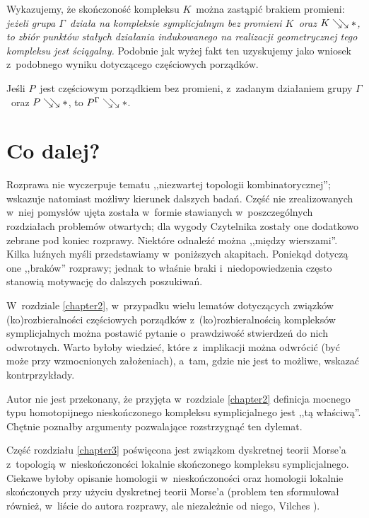 Wykazujemy, że skończoność kompleksu $K$~można zastąpić brakiem promieni: \textit{jeżeli grupa $\Gamma$~działa na kompleksie symplicjalnym bez promieni $K$~oraz $K\searrow\!\!\searrow *$, to zbiór punktów stałych działania indukowanego na realizacji geometrycznej tego kompleksu jest ściągalny.} Podobnie jak wyżej fakt ten uzyskujemy jako wniosek z~podobnego wyniku dotyczącego częściowych porządków.

\begin{stw*}[\ref{stw-sciaglana_g_przestrzen_sciagalne_punkty_stale}]
Jeśli $P$~jest częściowym porządkiem bez promieni, z~zadanym działaniem grupy $\Gamma$~oraz $P\searrow\!\!\searrow *$, to $P^\Gamma\searrow\!\!\searrow *$.  
\end{stw*}

\section*{Co dalej?}
Rozprawa nie wyczerpuje tematu ,,niezwartej topologii kombinatorycznej''; wskazuje natomiast możliwy kierunek dalszych badań. Część nie zrealizowanych w~niej pomysłów ujęta została w~formie stawianych w~poszczególnych rozdziałach problemów otwartych; dla wygody Czytelnika zostały one dodatkowo zebrane pod koniec rozprawy. Niektóre odnaleźć można ,,między wierszami''. Kilka luźnych myśli przedstawiamy w~poniższych akapitach. Poniekąd dotyczą one ,,braków'' rozprawy; jednak to właśnie braki i~niedopowiedzenia często stanowią motywację do dalszych poszukiwań.

W~rozdziale \ref{chapter2}, w~przypadku wielu lematów dotyczących związków (ko)rozbieralności częściowych porządków z~(ko)rozbieralnością kompleksów symplicjalnych można postawić pytanie o~prawdziwość stwierdzeń do nich odwrotnych. Warto byłoby wiedzieć, które z~implikacji można odwrócić (być może przy wzmocnionych założeniach), a~tam, gdzie nie jest to możliwe, wskazać kontrprzykłady.

Autor nie jest przekonany, że przyjęta w~rozdziale \ref{chapter2} definicja mocnego typu homotopijnego nieskończonego kompleksu symplicjalnego jest ,,tą właściwą''. Chętnie poznałby argumenty pozwalające rozstrzygnąć ten dylemat.

Część rozdziału \ref{chapter3} poświęcona jest związkom dyskretnej teorii Morse'a z~topologią w~nieskończoności lokalnie skończonego kompleksu symplicjalnego. Ciekawe byłoby opisanie homologii w~nieskończoności oraz homologii lokalnie skończonych przy użyciu dyskretnej teorii Morse'a (problem ten sformułował również, w~liście do autora rozprawy, ale niezależnie od niego, Vilches \cite{Vilches}).

